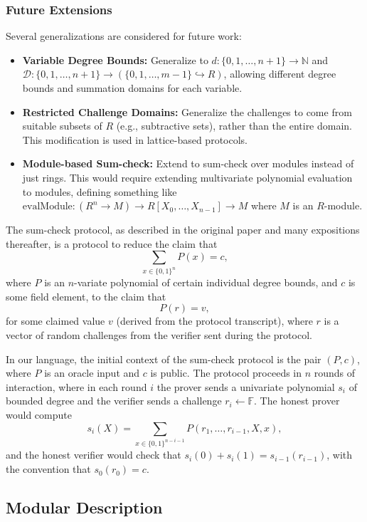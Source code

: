 \subsubsection{Future Extensions}

Several generalizations are considered for future work:

\begin{itemize}
    \item \textbf{Variable Degree Bounds:} Generalize to $d : \{0, 1, \ldots, n+1\} \to \mathbb{N}$ and $\mathcal{D} : \{0, 1, \ldots, n+1\} \to (\{0, 1, \ldots, m-1\} \hookrightarrow R)$, allowing different degree bounds and summation domains for each variable.

    \item \textbf{Restricted Challenge Domains:} Generalize the challenges to come from suitable subsets of $R$ (e.g., subtractive sets), rather than the entire domain. This modification is used in lattice-based protocols.

    \item \textbf{Module-based Sum-check:} Extend to sum-check over modules instead of just rings. This would require extending multivariate polynomial evaluation to modules, defining something like $\text{evalModule} : (R^n \to M) \to R[X_0, \ldots, X_{n-1}] \to M$ where $M$ is an $R$-module.
\end{itemize}

The sum-check protocol, as described in the original paper and many expositions thereafter, is a
protocol to reduce the claim that \[ \sum_{x \in \{0, 1\}^n} P(x) = c, \] where $P$ is an
$n$-variate polynomial of certain individual degree bounds, and $c$ is some field element, to the
claim that \[ P(r) = v, \] for some claimed value $v$ (derived from the protocol transcript), where
$r$ is a vector of random challenges from the verifier sent during the protocol.

In our language, the initial context of the sum-check protocol is the pair $(P, c)$, where $P$ is an
oracle input and $c$ is public. The protocol proceeds in $n$ rounds of interaction, where in each
round $i$ the prover sends a univariate polynomial $s_i$ of bounded degree and the verifier sends a
challenge $r_i \gets \mathbb{F}$. The honest prover would compute \[ s_i(X) = \sum_{x \in \{0,
1\}^{n - i - 1}} P(r_1, \ldots, r_{i - 1}, X, x), \] and the honest verifier would check that
$s_i(0) + s_i(1) = s_{i - 1}(r_{i - 1})$, with the convention that $s_0(r_0) = c$.

\subsection{Modular Description}\label{sec:sumcheck_modular}


